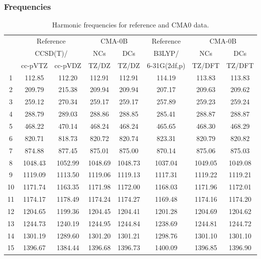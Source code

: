\documentclass[10pt,oneside]{article}
\begin{document}
\clearpage

\subsubsection*{Frequencies}
\begin{table}[h!]
\centering
\caption{Harmonic frequencies for reference and CMA0 data.}
\begin{tabular}{cccccccc}
\toprule
{} & \multicolumn{2}{c}{Reference} & \multicolumn{2}{c}{CMA-0B} &    Reference & \multicolumn{2}{c}{CMA-0B} \\
{} & \multicolumn{2}{c}{CCSD(T)/} &     NCs &     DCs &       B3LYP/ &     NCs &     DCs \\
{} &   cc-pVTZ & cc-pVDZ &   TZ/DZ &   TZ/DZ & 6-31G(2df,p) &  TZ/DFT &  TZ/DFT \\
\midrule
1  &    112.85 &  112.20 &  112.91 &  112.91 &       114.19 &  113.83 &  113.83 \\
2  &    209.79 &  215.38 &  209.94 &  209.94 &       207.17 &  209.63 &  209.62 \\
3  &    259.12 &  270.34 &  259.17 &  259.17 &       257.89 &  259.23 &  259.24 \\
4  &    288.79 &  289.03 &  288.86 &  288.85 &       285.41 &  288.87 &  288.87 \\
5  &    468.22 &  470.14 &  468.24 &  468.24 &       465.65 &  468.30 &  468.29 \\
6  &    820.71 &  818.73 &  820.72 &  820.74 &       823.31 &  820.79 &  820.82 \\
7  &    874.88 &  877.45 &  875.01 &  875.00 &       870.14 &  875.06 &  875.03 \\
8  &   1048.43 & 1052.99 & 1048.69 & 1048.73 &      1037.04 & 1049.05 & 1049.08 \\
9  &   1119.09 & 1113.50 & 1119.06 & 1119.13 &      1117.31 & 1119.22 & 1119.21 \\
10 &   1171.74 & 1163.35 & 1171.98 & 1172.00 &      1168.03 & 1171.96 & 1172.01 \\
11 &   1174.17 & 1178.49 & 1174.24 & 1174.27 &      1169.48 & 1174.16 & 1174.20 \\
12 &   1204.65 & 1199.36 & 1204.45 & 1204.41 &      1201.28 & 1204.69 & 1204.62 \\
13 &   1244.73 & 1240.19 & 1244.95 & 1244.84 &      1238.69 & 1244.81 & 1244.72 \\
14 &   1301.19 & 1289.60 & 1301.20 & 1301.21 &      1298.76 & 1301.10 & 1301.10 \\
15 &   1396.67 & 1384.44 & 1396.68 & 1396.73 &      1400.09 & 1396.85 & 1396.90 \\

\end{tabular}
\end{table}
\end{document}
